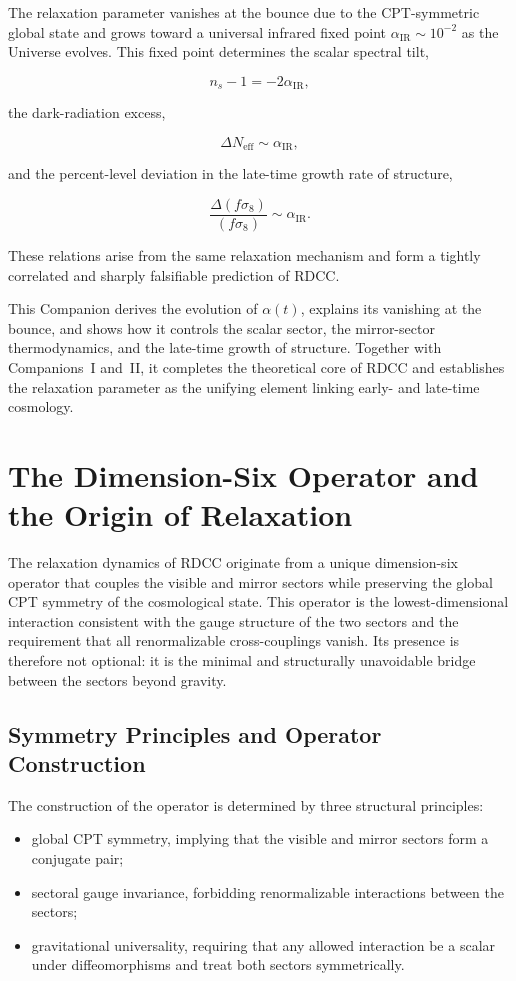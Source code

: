 \documentclass[11pt,a4paper]{article}
\begin{document}
The relaxation parameter vanishes at the bounce due to the CPT-symmetric global
state and grows toward a universal infrared fixed point $\alpha_{\mathrm{IR}} \sim 10^{-2}$ as the
Universe evolves. This fixed point determines the scalar spectral tilt,


\[
    n_s - 1 = -2\alpha_{\mathrm{IR}},
\]


the dark-radiation excess,


\[
    \Delta N_{\mathrm{eff}} \sim \alpha_{\mathrm{IR}},
\]


and the percent-level deviation in the late-time growth rate of structure,


\[
    \frac{\Delta(f\sigma_8)}{(f\sigma_8)} \sim \alpha_{\mathrm{IR}}.
\]


These relations arise from the same relaxation mechanism and form a tightly
correlated and sharply falsifiable prediction of RDCC.

This Companion derives the evolution of $\alpha(t)$, explains its vanishing at the
bounce, and shows how it controls the scalar sector, the mirror-sector thermodynamics,
and the late-time growth of structure. Together with Companions~I and~II, it completes
the theoretical core of RDCC and establishes the relaxation parameter as the unifying
element linking early- and late-time cosmology.

\section{The Dimension-Six Operator and the Origin of Relaxation}

The relaxation dynamics of RDCC originate from a unique dimension-six operator that
couples the visible and mirror sectors while preserving the global CPT symmetry of the
cosmological state. This operator is the lowest-dimensional interaction consistent with
the gauge structure of the two sectors and the requirement that all renormalizable
cross-couplings vanish. Its presence is therefore not optional: it is the minimal and
structurally unavoidable bridge between the sectors beyond gravity.

\subsection{Symmetry Principles and Operator Construction}

The construction of the operator is determined by three structural principles:

\begin{itemize}
    \item global CPT symmetry, implying that the visible and mirror sectors form a
    conjugate pair;
    \item sectoral gauge invariance, forbidding renormalizable interactions between the
    sectors;
    \item gravitational universality, requiring that any allowed interaction be a scalar
    under diffeomorphisms and treat both sectors symmetrically.
\end{itemize}
\end{document}
